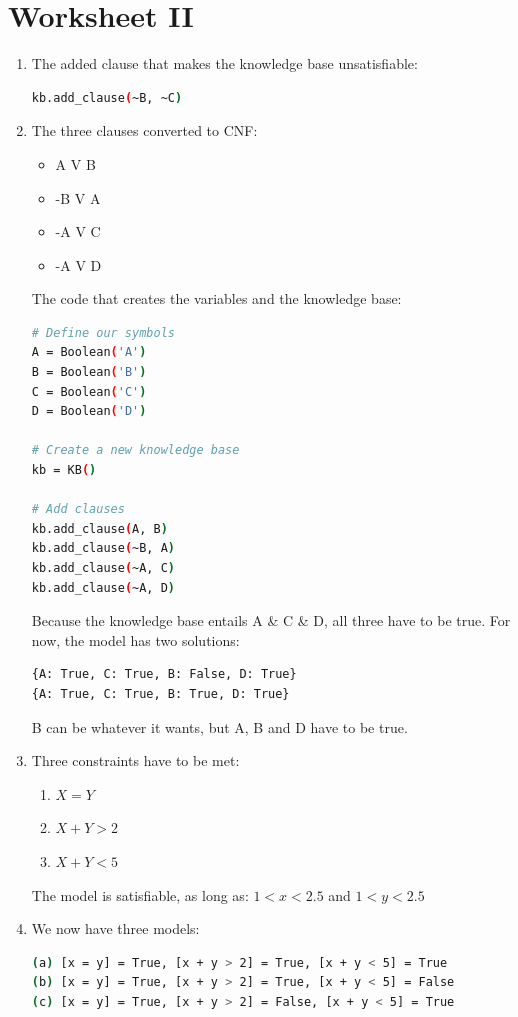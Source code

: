 \documentclass[a4paper,11pt]{article}
\begin{document}
\section{Worksheet II}
\begin{enumerate}
\item The added clause that makes the knowledge base unsatisfiable:
\begin{lstlisting}[language=bash]
kb.add_clause(~B, ~C)
\end{lstlisting}

\item The three clauses converted to CNF:
\begin{itemize}
\item A V B
\item -B V A
\item -A V C
\item -A V D
\end{itemize}
The code that creates the variables and the knowledge base:
\begin{lstlisting}[language=bash]
# Define our symbols
A = Boolean('A')
B = Boolean('B')
C = Boolean('C')
D = Boolean('D')

# Create a new knowledge base
kb = KB()

# Add clauses
kb.add_clause(A, B)
kb.add_clause(~B, A)
kb.add_clause(~A, C)
kb.add_clause(~A, D)
\end{lstlisting}
Because the knowledge base entails A \& C \& D, all three have to be true. For now, the model has two solutions:
\begin{lstlisting}[language=bash]
{A: True, C: True, B: False, D: True}
{A: True, C: True, B: True, D: True}
\end{lstlisting}
B can be whatever it wants, but A, B and D have to be true.

\item Three constraints have to be met:
\begin{enumerate}[I]
\item $X = Y$
\item $X + Y > 2$
\item $X + Y < 5$
\end{enumerate}
The model is satisfiable, as long as: 
$1 < x < 2.5$ and $1 < y < 2.5$

\item We now have three models:
\begin{lstlisting}[language=bash]
(a) [x = y] = True, [x + y > 2] = True, [x + y < 5] = True
(b) [x = y] = True, [x + y > 2] = True, [x + y < 5] = False
(c) [x = y] = True, [x + y > 2] = False, [x + y < 5] = True
\end{lstlisting}


\end{enumerate}
\end{document}
